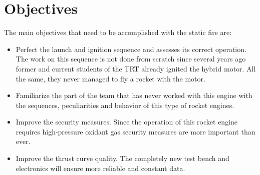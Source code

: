 
\section*{Objectives}

The main objectives that need to be accomplished with the static fire are:

\begin{itemize}
  \item Perfect the launch and ignition sequence and assesses its correct operation. The work on this sequence is not done from scratch since several years ago former and current students of the TRT already ignited the hybrid motor. All the same, they never managed to fly a rocket with the motor.
  \item Familiarize the part of the team that has never worked with this engine with the sequences, peculiarities and behavior of this type of rocket engines.
  \item Improve the security measures. Since the operation of this rocket engine requires high-pressure oxidant gas security measures are more important than ever.
  \item Improve the thrust curve quality. The completely new test bench and electronics will ensure more reliable and constant data. 
\end{itemize}

